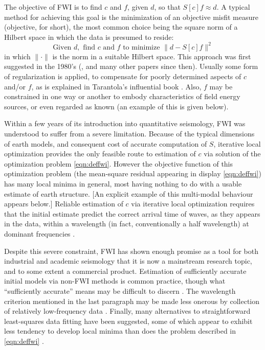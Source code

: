 The objective of FWI is to find $c$ and $f$, given $d$, so that
$S[c]f \approx d$. A typical method for achieving this goal is
the minimization of an objective misfit measure (objective, for
short), the most common choice being the square norm of a Hilbert
space in which the data is presumed to reside:
\begin{equation}
  \label{eqn:deffwi}
  \mbox{Given } d, \mbox{ find }c \mbox{ and }f \mbox{ to
    minimize }
  \|d -  S[c]f\|^2
\end{equation}
in which $\|\cdot\|$ is the norm in a suitable Hilbert space. This
approach was first suggested in the 1980's
(\cite[]{BamChavLai:79,Tara:84a,KolbColLai:86,Crasetal:90}, and many
other papers since then). Usually some form of regularization is
applied, to compensate for poorly determined aspects of $c$ and/or
$f$, as is explained in Tarantola's influential book
\cite[]{Tarantola:05}. Also, $f$ may be constrained in one way or
another to embody characteristics of field energy sources, or even
regarded as known (an example of this is given below).

Within a few years of its introduction into quantitative seismology,
FWI was understood to suffer from a severe limitation. Because of the
typical dimensions of earth models, and consequent cost of accurate
computation of $S$, iterative local optimization provides the only
feasible route to estimation of $c$ via solution of the optimization
problem \ref{eqn:deffwi}. However the objective function of this
optimization problem (the mean-square residual appearing in display \ref{eqn:deffwi}) has many local minima in general, most
having nothing to do with a usable estimate of earth structure. [An
explicit example of this multi-modal behaviour appears below.]
Reliable estimation of $c$ via iterative local optimization requires
that the initial estimate predict the correct arrival time of waves,
as they appears in the data, within a wavelength (in fact,
conventionally a half wavelength) at dominant
frequencies \cite[]{GauTarVir:86,VirieuxOperto:09}.

Despite this severe constraint, FWI has shown enough promise as a tool
for both industrial and academic seismology that it is now a
mainstream research topic, and to some extent a commercial
product. Estimation of sufficiently accurate initial models via
non-FWI methods is common practice, though what ``sufficiently
accurate'' means may be difficult to discern
\cite[]{Plessix:10}. The wavelength criterion mentioned in the last
paragraph may be made less onerous by collection of relatively
low-frequency data \cite[]{Wolfspar:16}. Finally, many alternatives to
straightforward least-squares data fitting have been suggested, some
of which appear to exhibit less tendency to develop local minima than
does the problem described in \ref{eqn:deffwi} \cite[]{Symes:09}.

